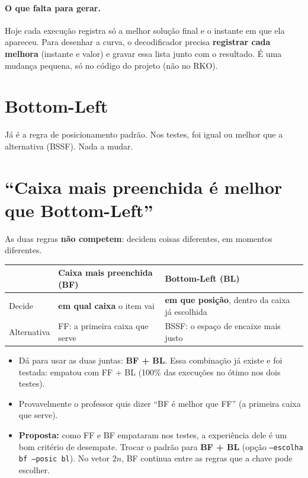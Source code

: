 \documentclass[11pt,a4paper]{article}
\begin{document}
\paragraph{O que falta para gerar.} Hoje cada execução registra só a melhor solução final e o instante em que
ela apareceu. Para desenhar a curva, o decodificador precisa \textbf{registrar cada melhora} (instante e valor) e
gravar essa lista junto com o resultado. É uma mudança pequena, só no código do projeto (não no RKO).

\section{Bottom-Left}
Já é a regra de posicionamento padrão. Nos testes, foi igual ou melhor que a alternativa (BSSF). Nada a mudar.

\section{``Caixa mais preenchida é melhor que Bottom-Left''}\label{sec:bf}
As duas regras \textbf{não competem}: decidem coisas diferentes, em momentos diferentes.

\begin{center}\small
\begin{tabular}{@{}p{3.4cm}p{6cm}p{6.2cm}@{}}
\toprule
& \textbf{Caixa mais preenchida (BF)} & \textbf{Bottom-Left (BL)} \\ \midrule
Decide & \textbf{em qual caixa} o item vai & \textbf{em que posição}, dentro da caixa já escolhida \\
Alternativa & FF: a primeira caixa que serve & BSSF: o espaço de encaixe mais justo \\
\bottomrule
\end{tabular}
\end{center}

\begin{itemize}[leftmargin=*,itemsep=2pt]
\item Dá para usar as duas juntas: \textbf{BF + BL}. Essa combinação já existe e foi testada: empatou com FF + BL
  (100\% das execuções no ótimo nos dois testes).
\item Provavelmente o professor quis dizer ``BF é melhor que FF'' (a primeira caixa que serve).
\item \textbf{Proposta:} como FF e BF empataram nos testes, a experiência dele é um bom critério de desempate.
  Trocar o padrão para \textbf{BF + BL} (opção \texttt{--escolha bf --posic bl}). No vetor $2n$, BF continua entre
  as regras que a chave pode escolher.
\end{itemize}
\end{document}

